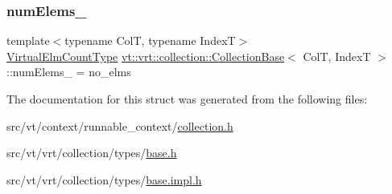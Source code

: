 \mbox{\label{structvt_1_1vrt_1_1collection_1_1_collection_base_a51c5c2114bb9b849878e384c25c4497b}} 
\subsubsection{\texorpdfstring{num\+Elems\+\_\+}{numElems\_}}
{\footnotesize\ttfamily template$<$typename ColT, typename IndexT$>$ \\
\hyperlink{namespacevt_ac115668758184050beff7a9281a2c490}{Virtual\+Elm\+Count\+Type} \hyperlink{structvt_1_1vrt_1_1collection_1_1_collection_base}{vt\+::vrt\+::collection\+::\+Collection\+Base}$<$ ColT, IndexT $>$\+::num\+Elems\+\_\+ = no\+\_\+elms\hspace{0.3cm}{\ttfamily [protected]}}



The documentation for this struct was generated from the following files\+:\begin{DoxyCompactItemize}
\item 
src/vt/context/runnable\+\_\+context/\hyperlink{collection_8h}{collection.\+h}\item 
src/vt/vrt/collection/types/\hyperlink{src_2vt_2vrt_2collection_2types_2base_8h}{base.\+h}\item 
src/vt/vrt/collection/types/\hyperlink{base_8impl_8h}{base.\+impl.\+h}\end{DoxyCompactItemize}
